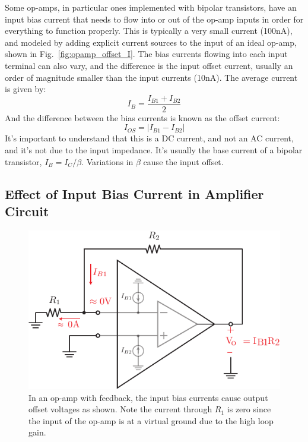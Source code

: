 Some op-amps, in particular ones implemented with bipolar transistors, have an input bias current that needs to flow into or out of the op-amp inputs in order for everything to function properly. This is typically a very small current (100nA), and modeled by adding explicit current sources to the input of an ideal op-amp, shown in Fig.~\ref{fig:opamp_offset_I}.  The bias currents flowing into each input terminal can also vary, and the difference is the input offset current, usually an order of magnitude smaller than the input currents (10nA).  The average current is given by:
%
\begin{equation}
       I_B = \frac{I_{B1}+I_{B2}}{2}
\end{equation}
%
And the difference between the bias currents is known as the offset current:
%
\begin{equation}
        I_{OS} = |I_{B1} - I_{B2} |
\end{equation}
%
It's important to understand that this is a DC current, and not an AC current, and it's not due to the input impedance.  It's usually the base current of a bipolar transistor, $I_B = I_C/\beta$.  Variations in $\beta$ cause the input offset.



\subsection{Effect of Input Bias Current in Amplifier Circuit}



\begin{figure}[tb]
\begin{center}
\includegraphics[scale=1]{opamp_offset_i2v}
\end{center}
\caption{In an op-amp with feedback, the input bias currents cause output offset voltages as shown.  Note the current through $R_1$ is zero since the input of the op-amp is at a virtual ground due to the high loop gain.} \label{fig:opamp_offset_i2v}
\end{figure}

